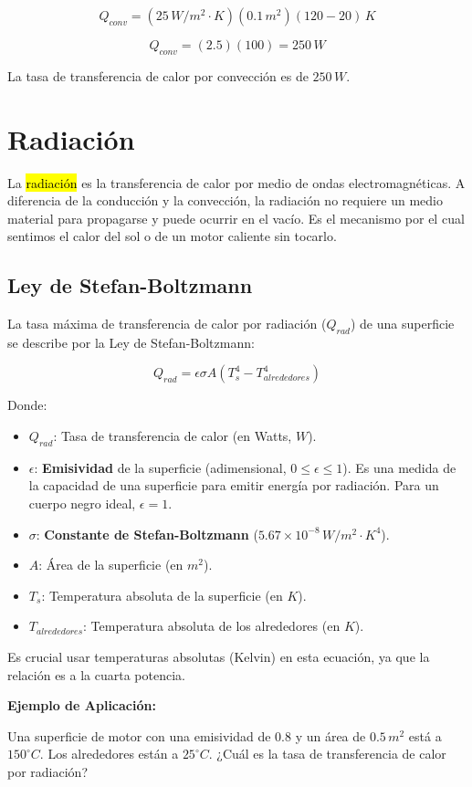 \documentclass{article}
\begin{document}
$$ Q_{conv} = (25 \, W/m^2 \cdot K)(0.1 \, m^2)(120 - 20) \, K $$

$$ Q_{conv} = (2.5)(100) = 250 \, W $$

La tasa de transferencia de calor por convección es de $250 \, W$.

\section*{Radiación}

La \hl{radiación} es la transferencia de calor por medio de ondas electromagnéticas. A diferencia de la conducción y la convección, la radiación no requiere un medio material para propagarse y puede ocurrir en el vacío. Es el mecanismo por el cual sentimos el calor del sol o de un motor caliente sin tocarlo.

\subsection*{Ley de Stefan-Boltzmann}

La tasa máxima de transferencia de calor por radiación ($Q_{rad}$) de una superficie se describe por la Ley de Stefan-Boltzmann:

$$ Q_{rad} = \epsilon \sigma A (T_s^4 - T_{alrededores}^4) $$

Donde:
\begin{itemize}
    \item $Q_{rad}$: Tasa de transferencia de calor (en Watts, $W$).
    \item $\epsilon$: \textbf{Emisividad} de la superficie (adimensional, $0 \le \epsilon \le 1$). Es una medida de la capacidad de una superficie para emitir energía por radiación. Para un cuerpo negro ideal, $\epsilon = 1$.
    \item $\sigma$: \textbf{Constante de Stefan-Boltzmann} ($5.67 \times 10^{-8} \, W/m^2 \cdot K^4$).
    \item $A$: Área de la superficie (en $m^2$).
    \item $T_s$: Temperatura absoluta de la superficie (en $K$).
    \item $T_{alrededores}$: Temperatura absoluta de los alrededores (en $K$).
\end{itemize}

Es crucial usar temperaturas absolutas (Kelvin) en esta ecuación, ya que la relación es a la cuarta potencia.

\textbf{Ejemplo de Aplicación:}

Una superficie de motor con una emisividad de $0.8$ y un área de $0.5 \, m^2$ está a $150^\circ C$. Los alrededores están a $25^\circ C$. ¿Cuál es la tasa de transferencia de calor por radiación?
\end{document}
